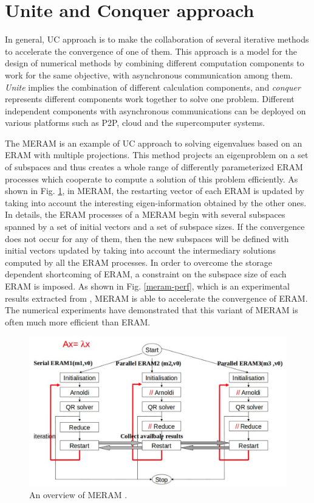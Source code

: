 \vspace{0.6in}

\section{Unite and Conquer approach}\label{Unite and Conquer approach}

In general, UC approach is to make the collaboration of several iterative methods to accelerate the convergence of one of them. This approach is a model for the design of numerical methods by combining different computation components to work for the same objective, with asynchronous communication among them. \textit{Unite} implies the combination of different calculation components, and \textit{conquer} represents different components work together to solve one problem. Different independent components with asynchronous communications can be deployed on various platforms such as P2P, cloud and the supercomputer systems. 

The MERAM \cite{emad2005multiple} is an example of UC approach to solving eigenvalues based on an ERAM with multiple projections. This method projects an eigenproblem on a set of subspaces and thus creates a whole range of differently parameterized ERAM processes which cooperate to compute a solution of this problem efficiently. As shown in Fig. \ref{meram}, in MERAM, the restarting vector of each ERAM is updated by taking into account the interesting eigen-information obtained by the other ones. In details, the ERAM processes of a MERAM begin with several subspaces spanned by a set of initial vectors and a set of subspace sizes. If the convergence does not occur for any of them, then the new subspaces will be defined with initial vectors updated by taking into account the intermediary solutions computed by all the ERAM processes. In order to overcome the storage dependent shortcoming of ERAM, a constraint on the subspace size of each ERAM is imposed. As shown in Fig. \ref{meram-perf}, which is an experimental results extracted from \cite{emad2005multiple}, MERAM is able to accelerate the convergence of ERAM. The numerical experiments have demonstrated that this variant of MERAM is often much more efficient than ERAM. 

\begin{figure}[htbp]
	\centering
	\includegraphics[width=6.3in]{fig/meram.png}
	\caption{An overview of MERAM \cite{emad2005multiple}.}
	\label{meram}
\end{figure}

